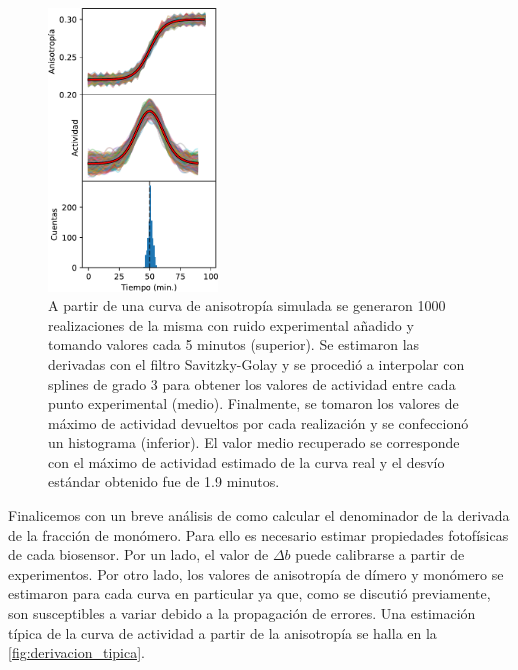 \begin{figure}[htb]
    \centering
    \includegraphics[width=0.4\textwidth]{img/cap_2/savgol_test.pdf}
    \caption{\footnotesize{A partir de una curva de anisotropía simulada se generaron 1000 realizaciones de la misma con ruido experimental añadido y tomando valores cada 5 minutos (superior). Se estimaron las derivadas con el filtro Savitzky-Golay y se procedió a interpolar con splines de grado 3 para obtener los valores de actividad entre cada punto experimental (medio). Finalmente, se tomaron los valores de máximo de actividad devueltos por cada realización y se confeccionó un histograma (inferior). El valor medio recuperado se corresponde con el máximo de actividad estimado de la curva real y el desvío estándar obtenido fue de 1.9 minutos.}}
    \label{fig:savgol_test}
\end{figure}

Finalicemos con un breve análisis de como calcular el denominador de la derivada de la fracción de monómero. Para ello es necesario estimar propiedades fotofísicas de cada biosensor. Por un lado, el valor de $\Delta b$ puede calibrarse a partir de experimentos. Por otro lado, los valores de anisotropía de dímero y monómero se estimaron para cada curva en particular ya que, como se discutió previamente, son susceptibles a variar debido a la propagación de errores. Una estimación típica de la curva de actividad a partir de la anisotropía se halla en la \cref{fig:derivacion_tipica}.

